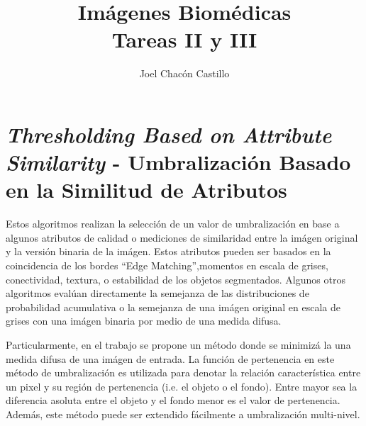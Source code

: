 \documentclass[preprint,12pt]{elsarticle}
\begin{document}
\begin{frontmatter}


\title{Im\'agenes Biom\'edicas \\ Tareas II y III}




\author{Joel Chac\'on Castillo}

\address{Guanajuato, M\'exico}
\end{frontmatter}

\section{ \textit{Thresholding Based on Attribute Similarity} - Umbralización Basado en la Similitud de Atributos}

Estos algoritmos realizan la selección de un valor de umbralización en base a algunos atributos de calidad o mediciones de similaridad entre la imágen original y la versión binaria de la imágen\cite{sezgin2004survey}.
%
Estos atributos pueden ser basados en la coincidencia de los bordes ``Edge Matching'',momentos en escala de grises, conectividad, textura, o estabilidad de los objetos segmentados.
%
Algunos otros algoritmos evalúan directamente la semejanza de las distribuciones de probabilidad acumulativa o la semejanza de una imágen original en escala de grises con una imágen binaria por medio de una medida difusa.

Particularmente, en el trabajo \citet{huang1995image} se propone un método donde se minimizá la una medida difusa de una imágen de entrada.
%
La función de pertenencia en este método de umbralización es utilizada para denotar la relación característica entre un pixel y su región de pertenencia (i.e. el objeto o el fondo).
%
Entre mayor sea la diferencia asoluta entre el objeto y el fondo menor es el valor de pertenencia.
%
Además, este método puede ser extendido fácilmente a umbralización multi-nivel. 
\end{document}
